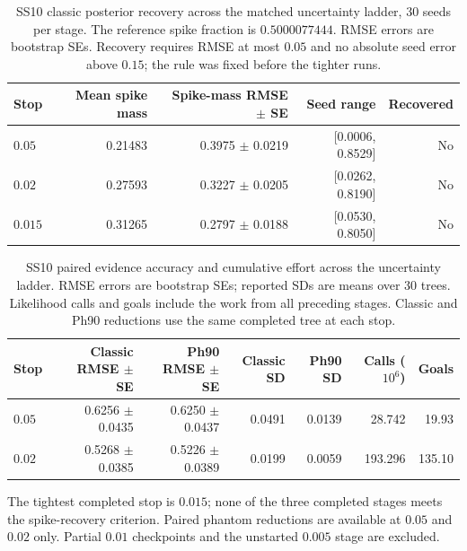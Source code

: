 \documentclass[pdflatex,sn-basic,icol]{sn-jnl}
\theoremstyle{plain}
\theoremstyle{definition}
\begin{document}
\begin{table}[t]
\centering
\caption{SS10 classic posterior recovery across the matched uncertainty ladder, 30 seeds per
stage. The reference spike fraction is $0.5000077444$. RMSE errors are bootstrap SEs. Recovery
requires RMSE at most $0.05$ and no absolute seed error above $0.15$; the rule was fixed before
the tighter runs.}
\label{tab:ss10_recovery}
\begin{tabular}{lrrrr}
\toprule
Stop & Mean spike mass & Spike-mass RMSE $\pm$ SE & Seed range & Recovered\\
\midrule

$0.05$ & 0.21483 & 0.3975 $\pm$ 0.0219 & [0.0006, 0.8529] & No \\

$0.02$ & 0.27593 & 0.3227 $\pm$ 0.0205 & [0.0262, 0.8190] & No \\

$0.015$ & 0.31265 & 0.2797 $\pm$ 0.0188 & [0.0530, 0.8050] & No \\

\bottomrule
\end{tabular}
\end{table}

\begin{table}[t]
\centering
\scriptsize
\caption{SS10 paired evidence accuracy and cumulative effort across the uncertainty ladder. RMSE
errors are bootstrap SEs; reported SDs are means over 30 trees. Likelihood calls and goals
include the work from all preceding stages. Classic and Ph90 reductions use the same completed
tree at each stop.}
\label{tab:ss10_ladder_evidence}
\begin{tabular}{lrrrrrr}
\toprule
Stop & Classic RMSE $\pm$ SE & Ph90 RMSE $\pm$ SE & Classic SD & Ph90 SD & Calls ($10^6$) & Goals\\
\midrule

$0.05$ & 0.6256 $\pm$ 0.0435 & 0.6250 $\pm$ 0.0437 & 0.0491 & 0.0139 & 28.742 & 19.93 \\

$0.02$ & 0.5268 $\pm$ 0.0385 & 0.5226 $\pm$ 0.0389 & 0.0199 & 0.0059 & 193.296 & 135.10 \\

\bottomrule
\end{tabular}
\end{table}


The tightest completed stop is $0.015$; none of the three completed stages meets the spike-recovery criterion. Paired phantom reductions are available at $0.05$ and $0.02$ only. Partial $0.01$ checkpoints and the unstarted $0.005$ stage are excluded.
\end{document}

